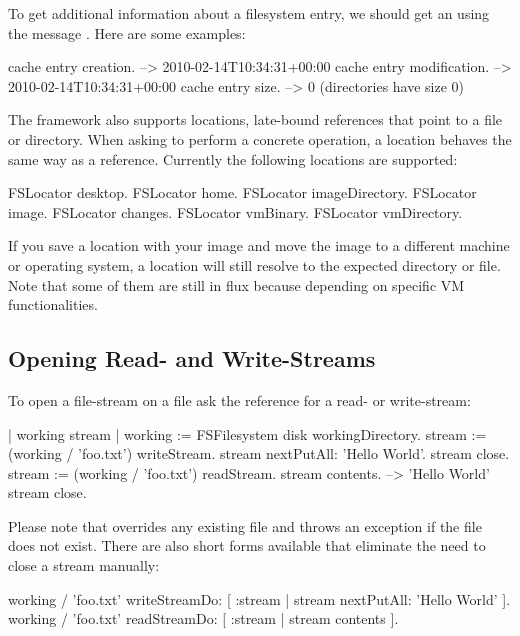 \documentclass[a4paper,10pt,twoside]{book}
\begin{document}
  
To get additional information about a filesystem entry, we should get an  using the message . Here are some examples:

\begin{code}{}
cache entry creation.		--> 2010-02-14T10:34:31+00:00
cache entry modification.	--> 2010-02-14T10:34:31+00:00
cache entry size.			--> 0 (directories have size 0)
\end{code} 

The framework also supports locations, late-bound references that point to a file or directory. When asking to perform a concrete operation, a location behaves the same way as a reference. Currently the following locations are supported:

\begin{code}{}
FSLocator desktop.
FSLocator home.
FSLocator imageDirectory.
FSLocator image.
FSLocator changes.
FSLocator vmBinary.
FSLocator vmDirectory.
\end{code} 

If you save a location with your image and move the image to a different machine or operating system, a location will still resolve to the expected directory or file. Note that some of them are still in flux because depending on specific VM functionalities. 

\subsection{Opening Read- and Write-Streams}

To open a file-stream on a file ask the reference for a read- or write-stream:

\begin{code}{}
| working stream |
working := FSFilesystem disk workingDirectory.
stream := (working / 'foo.txt') writeStream.
stream nextPutAll: 'Hello World'.
stream close.
stream := (working / 'foo.txt') readStream.
stream contents.			--> 'Hello World'
stream close.
\end{code}


Please note that  overrides any existing file and  throws an exception if the file does not exist. There are also short forms available that eliminate the need to close a stream manually:

\begin{code}{}
working / 'foo.txt' writeStreamDo: [ :stream | stream nextPutAll: 'Hello World' ].
working / 'foo.txt' readStreamDo: [ :stream | stream contents ].
\end{code}
\end{document}
